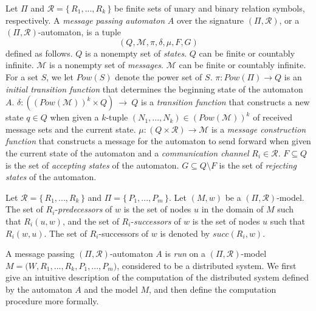 \documentclass[copyright,creativecommons]{eptcs}
\begin{document}
Let $\Pi$ and $\mathcal{R} = \{\, R_1,...,R_k\, \}$ be finite sets of unary and
binary relation symbols, respectively.
A \emph{message passing automaton} $A$ over the signature 
$(\Pi,\mathcal{R})$, or a $(\Pi,\mathcal{R})$-automaton,
is a tuple
$$(Q,\mathcal{M},\pi,\delta,\mu,F,G)$$
defined as follows.
$Q$ is a nonempty set of \emph{states}. $Q$ can be finite or countably infinite.
$\mathcal{M}$ is a nonempty set of \emph{messages}.
$\mathcal{M}$ can be finite or countably infinite.
For a set $S$, we let $\mathit{Pow}(S)$ denote the power set of $S$.
$\pi:\mathit{Pow}(\Pi)\rightarrow Q$ is an \emph{initial transition function} that
determines the beginning state of the automaton $A$. $\delta:((\mathit{Pow}(\mathcal{M}))^k\times Q)\ \rightarrow\ Q$
is a \emph{transition function} that constructs a new state $q\in Q$
when given a $k$-tuple $(N_1,...,N_k)\in(\mathit{Pow}(\mathcal{M}))^k$ of received message sets
and the current state. $\mu:(Q\times\mathcal{R}) \rightarrow \mathcal{M}$ is a \emph{message construction function}
that constructs a message for the automaton to send forward when given the current state of the automaton and a
\emph{communication channel} $R_i\in\mathcal{R}$.
$F\subseteq Q$ is the set of \emph{accepting states} of the automaton.
$G\subseteq Q\setminus F$ is the set of \emph{rejecting states} of the automaton.




Let $\mathcal{R} = \{\, R_1,...,R_k\, \}$ and $\Pi = \{\, P_1,...,P_m\, \}$.
Let $(M,w)$ be a $(\Pi,\mathcal{R})$-model. The set of $R_i$-\emph{predecessors} of $w$ is the set of
nodes $u$ in the domain of $M$ such that $R_i(u,w)$, and the set of $R_i$-\emph{successors} of $w$ is
the set of nodes $u$ such that $R_i(w,u)$. The set of $R_i$-successors of $w$ is denoted by $\mathit{succ}(R_i,w)$.




A message passing $(\Pi,\mathcal{R})$-automaton $A$ 
is \emph{run} on a $(\Pi,\mathcal{R})$-model $M = \bigl(W,R_1,...,R_k,P_1,...,P_m\bigr)$,
considered to be a distributed system. We first give an intuitive
description of the computation of the distributed system defined by
the automaton $A$ and the model $M$, and then define the computation
procedure more formally.
\end{document}
